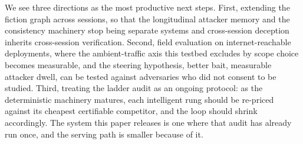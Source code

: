 We see three directions as the most productive next steps. First, extending the fiction
graph across sessions, so that the longitudinal attacker memory and the
consistency machinery stop being separate systems and cross-session
deception inherits cross-session verification. Second, field evaluation on
internet-reachable deployments, where the ambient-traffic axis this
testbed excludes by scope choice becomes measurable, and the steering
hypothesis, better bait, measurable attacker dwell, can be tested against
adversaries who did not consent to be studied. Third, treating the ladder
audit as an ongoing protocol: as the deterministic machinery matures,
each intelligent rung should be re-priced against its cheapest
certifiable competitor, and the loop should shrink accordingly. The
system this paper releases is one where that audit has already run once,
and the serving path is smaller because of it.
